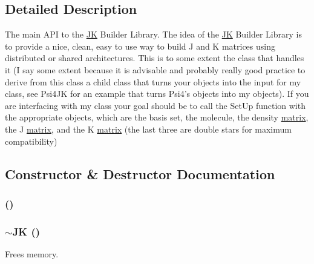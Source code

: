 \subsection{Detailed Description}
The main API to the \hyperlink{classJKBuilder_1_1JK}{JK} Builder Library. The idea of the \hyperlink{classJKBuilder_1_1JK}{JK} Builder Library is to provide a nice, clean, easy to use way to build J and K matrices using distributed or shared architectures. This is to some extent the class that handles it (I say some extent because it is advisable and probably really good practice to derive from this class a child class that turns your objects into the input for my class, see Psi4JK for an example that turns Psi4's objects into my objects). If you are interfacing with my class your goal should be to call the SetUp function with the appropriate objects, which are the basis set, the molecule, the density \hyperlink{classJKBuilder_1_1matrix}{matrix}, the J \hyperlink{classJKBuilder_1_1matrix}{matrix}, and the K \hyperlink{classJKBuilder_1_1matrix}{matrix} (the last three are double stars for maximum compatibility) 

\subsection{Constructor \& Destructor Documentation}
\hypertarget{classJKBuilder_1_1JK_ab667fd0f6ae1fdbf02a7aed8eb4cd4a8}{
\subsubsection[{JK}]{ ()}}
\label{classJKBuilder_1_1JK_ab667fd0f6ae1fdbf02a7aed8eb4cd4a8}
\hypertarget{classJKBuilder_1_1JK_a80533e1759361da2e871e53ba64161af}{
\subsubsection[{$\sim$JK}]{\setlength{\rightskip}{0pt plus 5cm}$\sim${\bf JK} ()}}
\label{classJKBuilder_1_1JK_a80533e1759361da2e871e53ba64161af}


Frees memory. 

